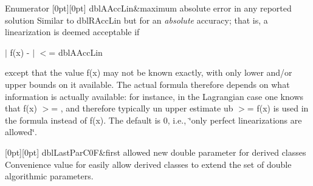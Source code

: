 \begin{DoxyEnumFields}{Enumerator}
[0pt][0pt]{}\mbox{\label{class_s_m_spp__di__unipi__it_1_1_c05_function_ad345d4c374ce38e8a5fe153e07da4fa5aa037194a4d5148cf2073a0bf6b1535d2}} 
dbl\+A\+Acc\+Lin&maximum absolute error in any reported solution Similar to dbl\+R\+Acc\+Lin but for an {\itshape absolute} accuracy; that is, a linearization is deemed acceptable if

$\vert$ f(x) -\/  $\vert$ $<$= dbl\+A\+Acc\+Lin

except that the value f(x) may not be known exactly, with only lower and/or upper bounds on it available. The actual formula therefore depends on what information is actually available\+: for instance, in the Lagrangian case one knows that f(x) $>$= , and therefore typically un upper estimate ub $>$= f(x) is used in the formula instead of f(x). The default is 0, i.\+e., \char`\"{}only perfect linearizations are allowed\char`\"{}. \\
\hline

[0pt][0pt]{}\mbox{\label{class_s_m_spp__di__unipi__it_1_1_c05_function_ad345d4c374ce38e8a5fe153e07da4fa5ae4b5d927ba9aae41ec6aa008a9daeee9}} 
dbl\+Last\+Par\+C0F&first allowed new double parameter for derived classes Convenience value for easily allow derived classes to extend the set of double algorithmic parameters. \\
\hline

\end{DoxyEnumFields}
\mbox{\label{class_s_m_spp__di__unipi__it_1_1_c05_function_acb8f83def674aa9de3dcc44cdcebc59d}} 

